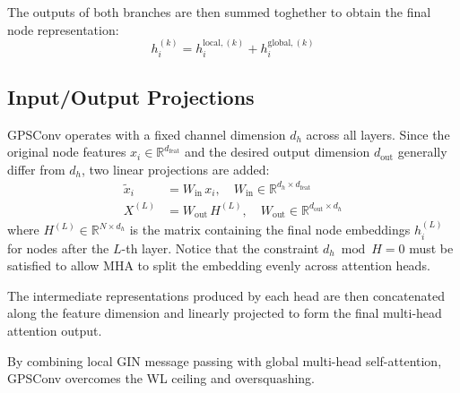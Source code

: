 The outputs of both branches are then summed toghether to obtain the final node representation:
\begin{equation}
  h_i^{(k)} = h_i^{\text{local},(k)} + h_i^{\text{global},(k)}
\end{equation}

\subsection{Input/Output Projections}

GPSConv operates with a fixed channel dimension $d_h$ across all layers.
Since the original node features $x_i \in \mathbb{R}^{d_{\text{feat}}}$ and
the desired output dimension $d_{\text{out}}$ generally differ from $d_h$,
two linear projections are added:
\begin{align}
  \tilde{x}_i &= W_{\text{in}}\, x_i, \quad W_{\text{in}} \in \mathbb{R}^{d_h \times d_{\text{feat}}} \\
  X^{(L)} &= W_{\text{out}}\, H^{(L)}, \quad W_{\text{out}} \in \mathbb{R}^{d_{\text{out}} \times d_h}
\end{align}
where $H^{(L)} \in \mathbb{R}^{N \times d_h}$ is the matrix containing the final node embeddings $h_i^{(L)}$ for nodes after the $L$-th layer.
Notice that the constraint $d_h \bmod H = 0$ must be satisfied to allow MHA to split the embedding evenly across attention heads.

The intermediate representations produced by each head are then concatenated along the feature dimension and linearly projected to form the final multi-head attention output.

By combining local GIN message passing with global multi-head self-attention, GPSConv overcomes the WL ceiling and oversquashing.
